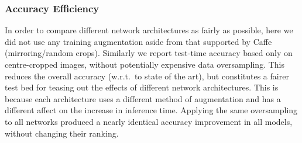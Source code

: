 \documentclass[thesis]{subfiles}
\begin{document}
	\subsubsection{Accuracy \vs Efficiency}
	In order to compare different network architectures as fairly as possible, here we did not use any training
	augmentation aside from that supported by Caffe~\citep{Jia2014} (mirroring/random crops). Similarly we report test-time 
	accuracy based only on centre-cropped images, without potentially expensive data oversampling. 
	This reduces the overall accuracy (w.r.t.\ to state of the art), but constitutes a fairer test bed for teasing out the effects of different network architectures. This is because each architecture uses a different method of augmentation and has a different affect on the increase in inference time.
	Applying the same oversampling to all networks produced a nearly identical accuracy improvement in 
	all models, without changing their ranking.
\end{document}
